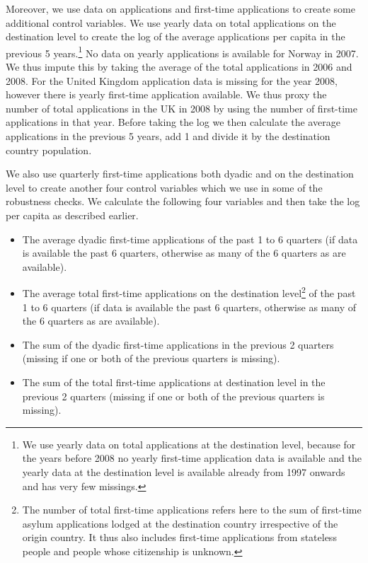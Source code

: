 \documentclass[11pt,a4paper]{scrartcl}
\begin{document}
Moreover, we use data on applications and first-time applications to create some additional control variables. We use yearly data on total applications on the destination level to create the log of the average applications per capita in the previous 5 years.\footnote{We use yearly data on total applications at the destination level, because for the years before 2008 no yearly first-time application data is available and the yearly data at the destination level is available already from 1997 onwards and has very few missings.} No data on yearly applications is available for Norway in 2007. We thus impute this by taking the average of the total applications in 2006 and 2008. For the United Kingdom application data is missing for the year 2008, however there is yearly first-time application available. We thus proxy the number of total applications in the UK in 2008 by using the number of first-time applications in that year. Before taking the log we then calculate the average applications in the previous 5 years, add 1 and divide it by the destination country population. 

We also use quarterly first-time applications both dyadic and on the destination level to create another four control variables which we use in some of the robustness checks. We calculate the following four variables and then take the log per capita as described earlier. 
\begin{itemize}
	\itemsep-0.2em
	\item The average dyadic first-time applications of the past 1 to 6 quarters (if data is available the past 6 quarters, otherwise as many of the 6 quarters as are available).
	\item  The average total first-time applications on the destination level\footnote{The number of total first-time applications refers here to the sum of first-time asylum applications lodged at the destination country irrespective of the origin country. It thus also includes first-time applications from stateless people and people whose citizenship is unknown.} of the past 1 to 6 quarters (if data is available the past 6 quarters, otherwise as many of the 6 quarters as are available).
	\item The sum of the dyadic first-time applications in the previous 2 quarters (missing if one or both of the previous quarters is missing).
	\item The sum of the total first-time applications at destination level in the previous 2 quarters (missing if one or both of the previous quarters is missing).
\end{itemize}
\end{document}
